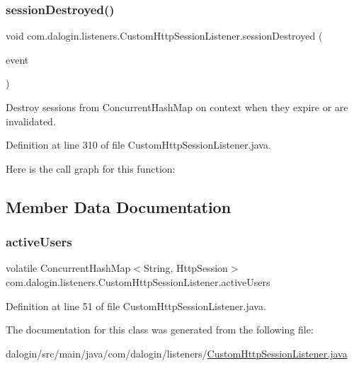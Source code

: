 \subsubsection{\texorpdfstring{session\+Destroyed()}{sessionDestroyed()}}
{\footnotesize\ttfamily void com.\+dalogin.\+listeners.\+Custom\+Http\+Session\+Listener.\+session\+Destroyed (\begin{DoxyParamCaption}\item[{Http\+Session\+Event}]{event }\end{DoxyParamCaption})}

Destroy sessions from Concurrent\+Hash\+Map on context when they expire or are invalidated. 

Definition at line 310 of file Custom\+Http\+Session\+Listener.\+java.

Here is the call graph for this function\+:


\subsection{Member Data Documentation}
\mbox{\label{classcom_1_1dalogin_1_1listeners_1_1_custom_http_session_listener_ab05ca2cc5c3a555963bb18411aa1cfb1}} 
\subsubsection{\texorpdfstring{active\+Users}{activeUsers}}
{\footnotesize\ttfamily volatile Concurrent\+Hash\+Map$<$String, Http\+Session$>$ com.\+dalogin.\+listeners.\+Custom\+Http\+Session\+Listener.\+active\+Users\hspace{0.3cm}{\ttfamily [static]}}



Definition at line 51 of file Custom\+Http\+Session\+Listener.\+java.



The documentation for this class was generated from the following file\+:\begin{DoxyCompactItemize}
\item 
dalogin/src/main/java/com/dalogin/listeners/\hyperlink{_custom_http_session_listener_8java}{Custom\+Http\+Session\+Listener.\+java}\end{DoxyCompactItemize}
